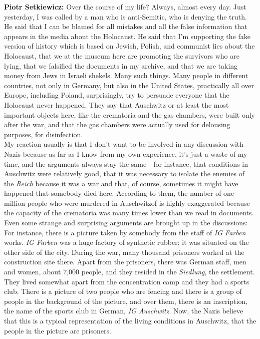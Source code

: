 \textbf{Piotr Setkiewicz:} Over the course of my life? Always, almost every day. Just yesterday, I was called by a man who is anti-Semitic, who is denying the truth. He said that I can be blamed for all mistakes and all the false information that appears in the media about the Holocaust. He said that I'm supporting the fake version of history which is based on Jewish, Polish, and communist lies about the Holocaust, that we at the museum here are promoting the survivors who are lying, that we falsified the documents in my archive, and that we are taking money from Jews in Israeli shekels. Many such things. Many people in different countries, not only in Germany, but also in the United States, practically all over Europe, including Poland, surprisingly, try to persuade everyone that the Holocaust never happened. They say that Auschwitz or at least the most important objects here, like the crematoria and the gas chambers, were built only after the war, and that the gas chambers were actually used for delousing purposes, for disinfection.\\ 
My reaction usually is that I don't want to be involved in any discussion with Nazis because as far as I know from my own experience, it's just a waste of my time, and the arguments always stay the same - for instance, that conditions in Auschwitz were relatively good, that it was necessary to isolate the enemies of the \textit{Reich} because it was a war and that, of course, sometimes it might have happened that somebody died here. According to them, the number of one million people who were murdered in Auschwitzof is highly exaggerated because the capacity of the crematoria was many times lower than we read in documents.\\ 
Even some strange and surprising arguments are brought up in the discussions: For instance, there is a picture taken by somebody from the staff of \textit{IG Farben} works. \textit{IG Farben} was a huge factory of synthetic rubber; it was situated on the other side of the city. During the war, many thousand prisoners worked at the construction site there. Apart from the prisoners, there was German staff, men and women, about 7,000 people, and they resided in the \textit{Siedlung}, the settlement. They lived somewhat apart from the concentration camp and they had a sports club. There is a picture of two people who are fencing and there is a group of people in the background of the picture, and over them, there is an inscription, the name of the sports club in German, \textit{IG Auschwitz}. Now, the Nazis believe that this is a typical representation of the living conditions in Auschwitz, that the people in the picture are prisoners.\\ 

